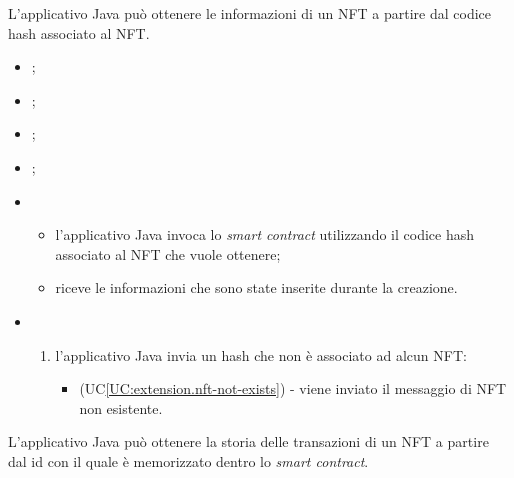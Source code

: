 \label{UC:get-nft-by-hash}

L'applicativo Java può ottenere le informazioni di un NFT a partire dal codice hash associato al NFT.

\begin{itemize}
  \item {};
  \item {};
  \item {};
  \item {};
  
  \item \UCMain
  \begin{itemize}
    \item l'applicativo Java invoca lo \textit{smart contract} utilizzando il codice hash associato al NFT che vuole ottenere;
    \item riceve le informazioni che sono state inserite durante la creazione. 
  \end{itemize}
  
  \item \UCExt
  \begin{enumerate}[label=\lett]
    \item l'applicativo Java invia un hash che non è associato ad alcun NFT:
    \begin{itemize}
      \item (UC\ref{UC:extension.nft-not-exists}) - viene inviato il messaggio di NFT non esistente.
    \end{itemize}
  \end{enumerate}
\end{itemize}

\label{UC:get-transaction-history}

L'applicativo Java può ottenere la storia delle transazioni di un NFT a partire dal id con il quale è memorizzato dentro lo \textit{smart contract}.

